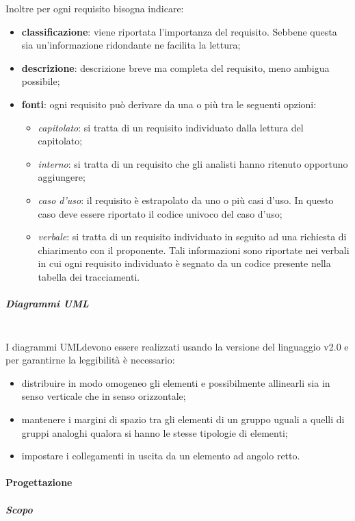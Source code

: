 \noindent
Inoltre per ogni requisito bisogna indicare:	
	\begin{itemize}		
		\item \textbf{classificazione}: viene riportata l'importanza del requisito. 
			Sebbene questa sia un'informazione ridondante ne facilita la lettura;
		\item \textbf{descrizione}: descrizione breve ma completa del requisito, 
			meno ambigua possibile;
		\item \textbf{fonti}: ogni requisito può derivare da una o più tra le 
		seguenti opzioni:
		\begin{itemize}
			\item \textit{capitolato\glo}: si tratta di un requisito individuato dalla 
				lettura del capitolato\glo;
			\item \textit{interno}: si tratta di un requisito che gli analisti hanno 
				ritenuto opportuno aggiungere;
			\item \textit{caso d'uso}: il requisito è estrapolato da uno o più casi 
				d'uso. In questo caso deve essere riportato il codice univoco del caso d'uso;
			\item \textit{verbale}: si tratta di un requisito individuato in seguito ad 
				una richiesta di chiarimento con il proponente. Tali informazioni sono riportate 
				nei verbali in cui ogni requisito individuato è segnato da un codice presente 
				nella tabella dei tracciamenti. \\
		\end{itemize}
	\end{itemize}

\subparagraph{Diagrammi UML} \mbox{}\\

I diagrammi UML\glosp devono essere realizzati usando la versione del 
linguaggio v2.0 e per garantirne la leggibilità è necessario:
	\begin{itemize}
		\item distribuire in modo omogeneo gli elementi e possibilmente allinearli 
			sia in senso verticale che in senso orizzontale;
		\item mantenere i margini di spazio tra gli elementi di un gruppo uguali a 
			quelli di gruppi analoghi qualora si hanno le stesse tipologie di elementi;
		\item impostare i collegamenti in uscita da un elemento ad angolo retto. 
	\end{itemize}

\paragraph{Progettazione} 
\subparagraph{Scopo} \mbox{}\\


